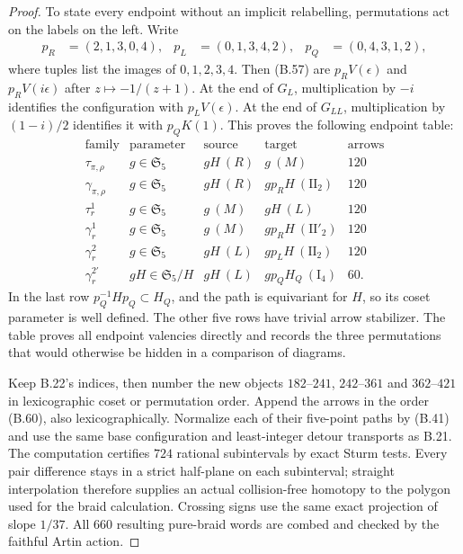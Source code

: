 \begin{proof}
To state every endpoint without an implicit relabelling,
permutations act on the labels on the left.  Write
\[
\begin{aligned}
 p_R&=(2,1,3,0,4),&
 p_L&=(0,1,3,4,2),&
 p_Q&=(0,4,3,1,2),
\end{aligned}                                                     \tag{B.59}
\]
where tuples list the images of $0,1,2,3,4$.
Then (B.57) are $p_R V(\epsilon)$ and
$p_R V(i\epsilon)$ after $z\mapsto-1/(z+1)$.
At the end of $G_L$, multiplication by $-i$ identifies
the configuration with $p_L V(\epsilon)$.  At the end
of $G_{LL}$, multiplication by $(1-i)/2$ identifies it
with $p_QK(1)$.  This proves the following endpoint table:
\[
\begin{array}{c|c|c|c|r}
 \text{family}&\text{parameter}&\text{source}&\text{target}&
 \text{arrows}\\ \hline
 \tau_{\pi,\rho}&g\in\mathfrak S_5&gH\ (R)&g\ (M)&120\\
 \gamma_{\pi,\rho}&g\in\mathfrak S_5&gH\ (R)&gp_RH\ (\mathrm{II}_2)&120\\
 \tau_r^1&g\in\mathfrak S_5&g\ (M)&gH\ (L)&120\\
 \gamma_r^1&g\in\mathfrak S_5&g\ (M)&gp_RH\ (\mathrm{II}'_2)&120\\
 \gamma_r^2&g\in\mathfrak S_5&gH\ (L)&gp_LH\ (\mathrm{II}_2)&120\\
 \gamma_r^{2'}&gH\in\mathfrak S_5/H&gH\ (L)&gp_QH_Q\ (\mathrm I_4)&60.
\end{array}                                                     \tag{B.60}
\]
In the last row $p_Q^{-1}Hp_Q\subset H_Q$, and the
path is equivariant for $H$, so its coset parameter is
well defined.  The other five rows have trivial arrow
stabilizer.  The table proves all endpoint valencies
directly and records the three permutations that would
otherwise be hidden in a comparison of diagrams.

Keep B.22's indices, then number the new objects $182$--$241$,
$242$--$361$ and $362$--$421$ in lexicographic coset or
permutation order.  Append the arrows in the order (B.60),
also lexicographically.  Normalize each of their five-point
paths by (B.41) and use the same base configuration and
least-integer detour transports as B.21.  The computation
certifies $724$ rational subintervals by exact Sturm tests.
Every pair difference stays in a strict half-plane on each
subinterval; straight interpolation therefore supplies an
actual collision-free homotopy to the polygon used for
the braid calculation.  Crossing signs use the same exact
projection of slope $1/37$.  All $660$ resulting pure-braid
words are combed and checked by the faithful Artin action.


\end{proof}
